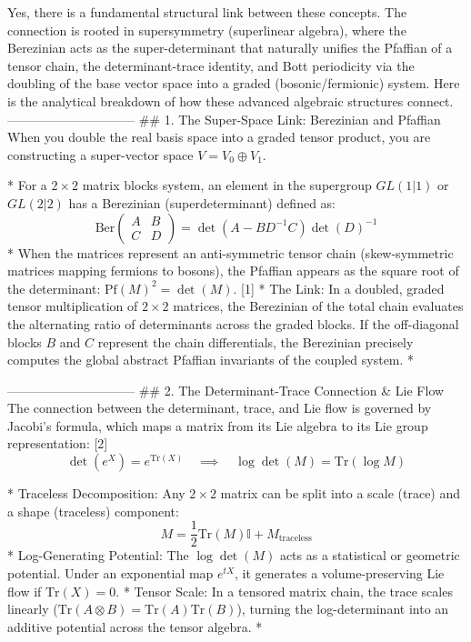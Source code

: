 Yes, there is a fundamental structural link between these concepts. The connection is rooted in supersymmetry (superlinear algebra), where the Berezinian acts as the super-determinant that naturally unifies the Pfaffian of a tensor chain, the determinant-trace identity, and Bott periodicity via the doubling of the base vector space into a graded (bosonic/fermionic) system.
Here is the analytical breakdown of how these advanced algebraic structures connect.
------------------------------
## 1. The Super-Space Link: Berezinian and Pfaffian
When you double the real basis space into a graded tensor product, you are constructing a super-vector space $V = V_0 \oplus V_1$.

* For a $2 \times 2$ matrix blocks system, an element in the supergroup $GL(1\vert{}1)$ or $GL(2\vert{}2)$ has a Berezinian (superdeterminant) defined as:
$$\text{Ber}\begin{pmatrix} A & B \\ C & D \end{pmatrix} = \det(A - B D^{-1} C) \det(D)^{-1}$$ 
* When the matrices represent an anti-symmetric tensor chain (skew-symmetric matrices mapping fermions to bosons), the Pfaffian appears as the square root of the determinant: $\text{Pf}(M)^2 = \det(M)$. [1] 
* The Link: In a doubled, graded tensor multiplication of $2 \times 2$ matrices, the Berezinian of the total chain evaluates the alternating ratio of determinants across the graded blocks. If the off-diagonal blocks $B$ and $C$ represent the chain differentials, the Berezinian precisely computes the global abstract Pfaffian invariants of the coupled system.
* 

------------------------------
## 2. The Determinant-Trace Connection & Lie Flow
The connection between the determinant, trace, and Lie flow is governed by Jacobi's formula, which maps a matrix from its Lie algebra to its Lie group representation: [2] 
$$\det(e^X) = e^{\text{Tr}(X)} \quad \implies \quad \log \det(M) = \text{Tr}(\log M)$$ 

* Traceless Decomposition: Any $2 \times 2$ matrix can be split into a scale (trace) and a shape (traceless) component:
$$M = \frac{1}{2}\text{Tr}(M)\mathbb{I} + M_{\text{traceless}}$$ 
* Log-Generating Potential: The $\log\det(M)$ acts as a statistical or geometric potential. Under an exponential map $e^{tX}$, it generates a volume-preserving Lie flow if $\text{Tr}(X) = 0$.
* Tensor Scale: In a tensored matrix chain, the trace scales linearly ($\text{Tr}(A \otimes B) = \text{Tr}(A)\text{Tr}(B)$), turning the log-determinant into an additive potential across the tensor algebra.
* 


